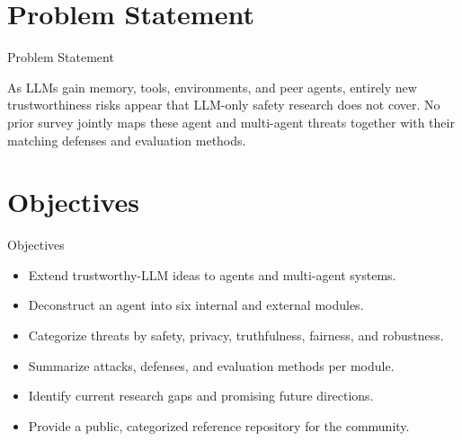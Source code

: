 \documentclass[10pt]{beamer}
\begin{document}
\section{Problem Statement}
\begin{frame}{Problem Statement}
  \begin{block}{}
  As LLMs gain memory, tools, environments, and peer agents, entirely new trustworthiness risks appear that LLM-only safety research does not cover. No prior survey jointly maps these agent and multi-agent threats together with their matching defenses and evaluation methods.
  \end{block}
\end{frame}
\section{Objectives}
\begin{frame}{Objectives}
\begin{itemize}
  \item Extend trustworthy-LLM ideas to agents and multi-agent systems.
  \item Deconstruct an agent into six internal and external modules.
  \item Categorize threats by safety, privacy, truthfulness, fairness, and robustness.
  \item Summarize attacks, defenses, and evaluation methods per module.
  \item Identify current research gaps and promising future directions.
  \item Provide a public, categorized reference repository for the community.
\end{itemize}
\end{frame}
\end{document}
